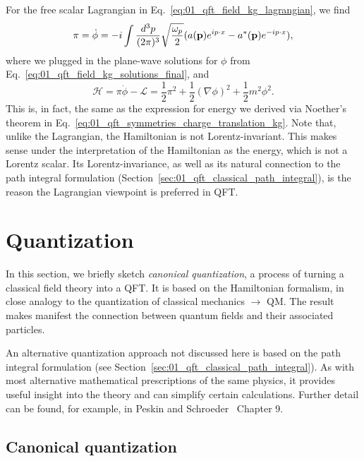 For the free scalar Lagrangian in Eq.~\ref{eq:01_qft_field_kg_lagrangian}, we find
\begin{equation}
	\label{eq:01_qft_hamiltonian_kg_momenta}
    \pi = \dot\phi = -i \int \frac{d^3p}{(2\pi)^3} \sqrt{\frac{\omega_p}{2}} (a(\mathbf{p})e^{ip\cdot x} - a^*(\mathbf{p})e^{-ip\cdot x}),
\end{equation}
where we plugged in the plane-wave solutions for $\phi$ from Eq.~\ref{eq:01_qft_field_kg_solutions_final}, and
\begin{equation}
    \label{eq:01_qft_hamiltonian_kg}
    \mathcal H = \pi\dot\phi - \mathcal L = \frac{1}{2}\pi^2 + \frac{1}{2}(\nabla\phi)^2 + \frac{1}{2}m^2\phi^2.
\end{equation}
This is, in fact, the same as the expression for energy we derived via Noether's theorem in Eq.~\ref{eq:01_qft_symmetries_charge_translation_kg}.
Note that, unlike the Lagrangian, the Hamiltonian is not Lorentz-invariant.
This makes sense under the interpretation of the Hamiltonian as the energy, which is not a Lorentz scalar.
Its Lorentz-invariance, as well as its natural connection to the path integral formulation (Section~\ref{sec:01_qft_classical_path_integral}), is the reason the Lagrangian viewpoint is preferred in QFT.


\section{Quantization}
\label{sec:01_qft_quantization}

In this section, we briefly sketch \textit{canonical quantization}, a process of turning a classical field theory into a QFT.
It is based on the Hamiltonian formalism, in close analogy to the quantization of classical mechanics $\rightarrow$ QM.
The result makes manifest the connection between quantum fields and their associated particles.

An alternative quantization approach not discussed here is based on the path integral formulation (see Section~\ref{sec:01_qft_classical_path_integral}). 
As with most alternative mathematical prescriptions of the same physics, it provides useful insight into the theory and can simplify certain calculations.
Further detail can be found, for example, in Peskin and Schroeder~\cite{Peskin:1995ev} Chapter 9.

\subsection{Canonical quantization}

